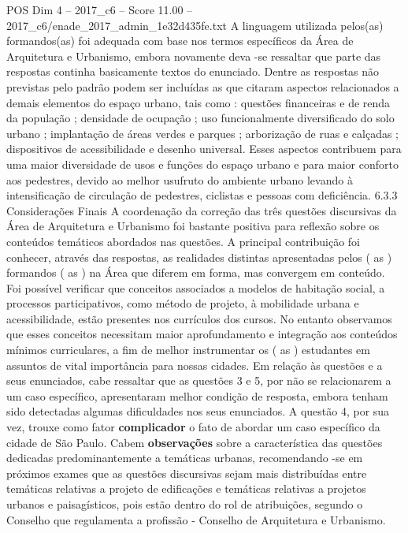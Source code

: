 \begin{textsample}{POS Dim 4 – 2017\_c6 – Score 11.00 – 2017\_c6/enade\_2017\_admin\_1e32d435fe.txt}
A linguagem utilizada pelos(as) formandos(as) foi adequada com base nos termos específicos da Área de Arquitetura e Urbanismo, embora novamente deva -se ressaltar que parte das respostas continha basicamente textos do enunciado.
Dentre as respostas não previstas pelo padrão podem ser incluídas as que citaram aspectos relacionados a demais elementos do espaço urbano, tais como : questões financeiras e de renda da população ; densidade de ocupação ; uso funcionalmente diversificado do solo urbano ; implantação de áreas verdes e parques ; arborização de ruas e calçadas ; dispositivos de acessibilidade e desenho universal.
Esses aspectos contribuem para uma maior diversidade de usos e funções do espaço urbano e para maior conforto aos pedestres, devido ao melhor usufruto do ambiente urbano levando à intensificação de circulação de pedestres, ciclistas e pessoas com deficiência. 6.3.3 Considerações Finais A coordenação da correção das três questões discursivas da Área de Arquitetura e Urbanismo foi bastante positiva para reflexão sobre os conteúdos temáticos abordados nas questões.
A principal contribuição foi conhecer, através das respostas, as realidades distintas apresentadas pelos ( as ) formandos ( as ) na Área que diferem em forma, mas convergem em conteúdo.
Foi possível verificar que conceitos associados a modelos de habitação social, a processos participativos, como método de projeto, à mobilidade urbana e acessibilidade, estão presentes nos currículos dos cursos.
No entanto observamos que esses conceitos necessitam maior aprofundamento e integração aos conteúdos mínimos curriculares, a fim de melhor instrumentar os ( as ) estudantes em assuntos de vital importância para nossas cidades.
Em relação às questões e a seus enunciados, cabe ressaltar que as questões 3 e 5, por não se relacionarem a um caso específico, apresentaram melhor condição de resposta, embora tenham sido detectadas algumas dificuldades nos seus enunciados.
A questão 4, por sua vez, trouxe como fator \textbf{complicador} o fato de abordar um caso específico da cidade de São Paulo.
Cabem \textbf{observações} sobre a característica das questões dedicadas predominantemente a temáticas urbanas, recomendando -se em próximos exames que as questões discursivas sejam mais distribuídas entre temáticas relativas a projeto de edificações e temáticas relativas a projetos urbanos e paisagísticos, pois estão dentro do rol de atribuições, segundo o Conselho que regulamenta a profissão - Conselho de Arquitetura e Urbanismo.

\end{textsample}
